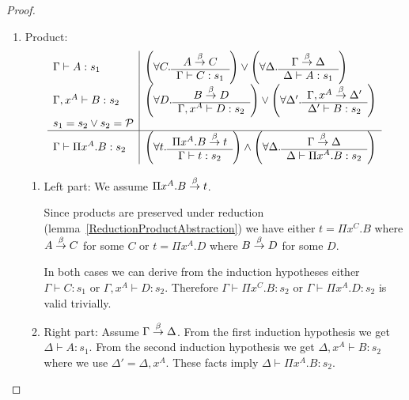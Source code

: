 \begin{theorem}
{\begin{proof}
\begin{enumerate}
\begin{enumerate}
                \item Product:
                $$
                \begin{array}{l|l}
                    \Gamma \vdash A: s_1
                    &
                    \left( \forall C. \begin{array}{c} A \stackrel{\beta}{\to} C \\ \hline \Gamma \vdash C: s_1\end{array} \right)
                    \lor
                    \left( \forall \Delta. \begin{array}{c} \Gamma \stackrel{\beta}{\to} \Delta \\ \hline \Delta \vdash A: s_1\end{array} \right)
                    \\
                    \Gamma,x^A \vdash B: s_2
                    &
                    \left( \forall D. \begin{array}{c} B \stackrel{\beta}{\to} D \\ \hline \Gamma,x^A \vdash D: s_2\end{array} \right)
                    \lor
                    \left( \forall \Delta'. \begin{array}{c} \Gamma,x^A \stackrel{\beta}{\to} \Delta' \\ \hline \Delta' \vdash B: s_2\end{array} \right)
                    \\
                    s_1 = s_2 \lor s_2 = {\cal P}
                    \\
                    \hline
                    \Gamma \vdash \Pi x^A. B : s_2
                    &
                    \left( \forall t. \begin{array}{c} \Pi x^A.B \stackrel{\beta}{\to} t \\ \hline \Gamma \vdash t: s_2\end{array} \right)
                    \land
                    \left( \forall \Delta. \begin{array}{c} \Gamma \stackrel{\beta}{\to} \Delta \\ \hline \Delta \vdash \Pi x^A. B: s_2\end{array} \right)
                \end{array}
                $$
                \begin{enumerate}
                    \item Left part: We assume $\Pi x^A. B \stackrel{\beta}{\to} t$.

                    Since products are preserved under reduction
                        (lemma~\ref{ReductionProductAbstraction}) we have either
                        $t = \Pi x^C. B$ where $A \stackrel{\beta}{\to} C$ for some $C$ or $t
                        = \Pi x^A.D$ where $B \stackrel{\beta}{\to} D$ for some $D$.

                    In both cases we can derive from the induction hypotheses
                        either $\Gamma \vdash C: s_1$ or $\Gamma,x^A \vdash D:
                        s_2$. Therefore $\Gamma \vdash \Pi x^C. B: s_2$ or $\Gamma
                        \vdash \Pi x^A.D: s_2$ is valid trivially.

                    \item Right part: Assume $\Gamma \stackrel{\beta}{\to} \Delta$. From the
                        first induction hypothesis we get $\Delta \vdash A:
                        s_1$. From the second induction hypothesis we get
                        $\Delta, x^A \vdash B: s_2$ where we use $\Delta' =
                        \Delta, x^A$. These facts imply $\Delta
                        \vdash \Pi x^A. B : s_2$.
                \end{enumerate}


\end{enumerate}
\end{enumerate}
\end{proof}}
\end{theorem}
